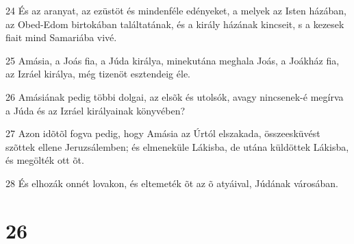 \par 24 És az aranyat, az ezüstöt és mindenféle edényeket, a melyek az Isten házában, az Obed-Edom birtokában találtatának, és a király házának kincseit, s a kezesek fiait mind Samariába vivé.
\par 25 Amásia, a Joás fia, a Júda királya, minekutána meghala Joás, a Joákház fia, az Izráel királya, még tizenöt esztendeig éle.
\par 26 Amásiának pedig többi dolgai, az elsõk és utolsók, avagy nincsenek-é megírva a Júda és az Izráel királyainak könyvében?
\par 27 Azon idõtõl fogva pedig, hogy Amásia az Úrtól elszakada, összeesküvést szõttek ellene Jeruzsálemben; és elmeneküle Lákisba, de utána küldöttek Lákisba, és megölték ott õt.
\par 28 És elhozák onnét lovakon, és eltemeték õt az õ atyáival, Júdának városában.

\chapter{26}

